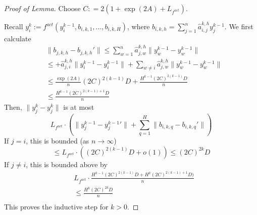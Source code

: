\documentclass[11pt,a4paper]{article}
\begin{document}
\begin{proof}[Proof of Lemma]
Choose $C : = 2(1 + \exp(2A) + L_{f^{act}})$.

Recall $y_i^k := f^{act}(y_i^{k-1}, b_{i,k,1}, \dots, b_{i,k,H})$, where $b_{i,k,h} = \sum_{j=1}^n \hat{a}_{i,j}^{k,h} y_j^{k-1}$.
We first calculate
\begin{align*}
& \|b_{j,k,h} - b_{j,k,h}'\|  \leq \sum_{w=1}^n \hat{a}_{j,w}^{k,h} \|y_w^{k-1} - y_w^{k-1}\| \\
& \leq + \hat{a}_{j,i}^{k,h} \|y_i^{k-1} - y_i^{k-1}\|  + \sum_{w \neq i} \hat{a}_{j,w}^{k,h} \|y_w^{k-1} - y_w^{k-1}\|  \\
& \leq \frac{\exp(2A)}{n}  (2C)^{2(k-1)} D + \frac{H^{k-1}(2C)^{2(k-1)}D}{n} \\
& \leq \frac{H^{k-1} (2C)^{2(k-1)+1} D}{n}
\end{align*}
Then, $\|y_j^k - {y_j^k}\|$ is at most
\begin{equation}
	L_{f^{act}} \cdot \left(\|y_j^{k-1}-{y_j^{k-1}}'\| + \sum_{q=1}^H \|b_{i,k,q} - b_{i,k,q}'\|\right)
\end{equation}
If $j= i$, this is bounded (as $n \rightarrow \infty$)
\begin{equation}
\leq L_{f^{act}} \cdot ((2C)^{2(k-1)}D + o(1)) \leq (2C)^{2k}D
\end{equation}
If $j\neq i$, this is bounded above by
\begin{align*}
  &  L_{f^{act}} \cdot \frac{H^{k-1} (2C)^{2(k-1)}D + H^{k} (2C)^{2(k-1)+1} D)}{n} \\
  &  \leq  \frac{H^{k} (2C)^{2k} D}{n} \\
\end{align*} 
This proves the inductive step for $k>0$.
\end{proof}


\end{document}
